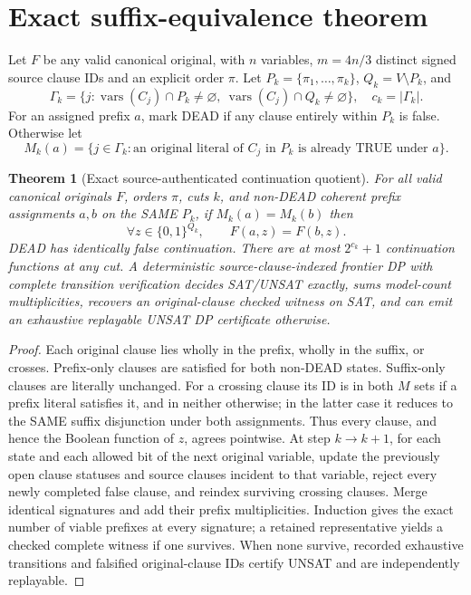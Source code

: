 \documentclass[11pt]{article}
\newtheorem{theorem}{Theorem}
\begin{document}
\section{Exact suffix-equivalence theorem}
\noindent Let $F$ be any valid canonical original, with $n$ variables, $m=4n/3$ distinct signed source clause IDs and an explicit order $\pi$. Let $P_k=\{\pi_1,\ldots,\pi_k\}$, $Q_k=V\setminus P_k$, and
\[
\Gamma_k=\{j:\operatorname{vars}(C_j)\cap P_k\ne\varnothing,\ \operatorname{vars}(C_j)\cap Q_k\ne\varnothing\},\quad c_k=|\Gamma_k|.
\]
For an assigned prefix $a$, mark DEAD if any clause entirely within $P_k$ is false. Otherwise let
\[
M_k(a)=\{j\in\Gamma_k:\text{an original literal of $C_j$ in $P_k$ is already TRUE under $a$}\}.
\]
\begin{theorem}[Exact source-authenticated continuation quotient]
For all valid canonical originals $F$, orders $\pi$, cuts $k$, and non-DEAD coherent prefix assignments $a,b$ on the SAME $P_k$, if $M_k(a)=M_k(b)$ then
\[
\forall z\in\{0,1\}^{Q_k},\qquad F(a,z)=F(b,z).
\]
DEAD has identically false continuation. There are at most $2^{c_k}+1$ continuation functions at any cut. A deterministic source-clause-indexed frontier DP with complete transition verification decides SAT/UNSAT exactly, sums model-count multiplicities, recovers an original-clause checked witness on SAT, and can emit an exhaustive replayable UNSAT DP certificate otherwise.
\end{theorem}
\begin{proof}
Each original clause lies wholly in the prefix, wholly in the suffix, or crosses. Prefix-only clauses are satisfied for both non-DEAD states. Suffix-only clauses are literally unchanged. For a crossing clause its ID is in both $M$ sets if a prefix literal satisfies it, and in neither otherwise; in the latter case it reduces to the SAME suffix disjunction under both assignments. Thus every clause, and hence the Boolean function of $z$, agrees pointwise. At step $k\to k+1$, for each state and each allowed bit of the next original variable, update the previously open clause statuses and source clauses incident to that variable, reject every newly completed false clause, and reindex surviving crossing clauses. Merge identical signatures and add their prefix multiplicities. Induction gives the exact number of viable prefixes at every signature; a retained representative yields a checked complete witness if one survives. When none survive, recorded exhaustive transitions and falsified original-clause IDs certify UNSAT and are independently replayable.
\end{proof}
\end{document}
